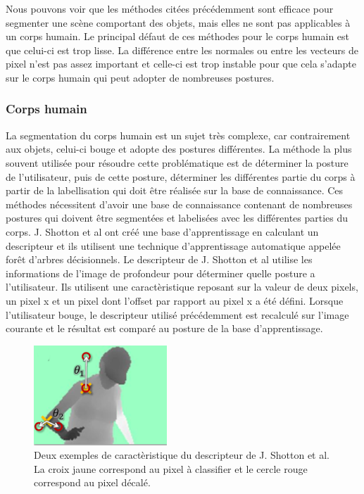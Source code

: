 Nous pouvons voir que les méthodes citées précédemment sont efficace pour segmenter une scène comportant des objets,
mais elles ne sont pas applicables à un corps humain. Le principal défaut de ces méthodes pour le corps humain est 
que celui-ci est trop lisse. La différence entre les normales ou entre les vecteurs de pixel n'est pas assez important
et celle-ci est trop instable pour que cela s'adapte sur le corps humain qui peut adopter de nombreuses postures.

\subsubsection{Corps humain}
La segmentation du corps humain est un sujet très complexe, car contrairement aux objets, celui-ci bouge et adopte
des postures différentes. La méthode la plus souvent utilisée pour résoudre cette problématique est de déterminer
la posture de l'utilisateur, puis de cette posture, déterminer les différentes partie du corps à partir de la labellisation
qui doit être réalisée sur la base de connaissance. 
Ces méthodes nécessitent d'avoir une base de connaissance contenant de nombreuses postures qui doivent
être segmentées et labelisées avec les différentes parties du corps. J. Shotton et al\cite{kinectSegmentation} ont
créé une base d'apprentissage en calculant un descripteur
et ils utilisent une technique d'apprentissage automatique appelée forêt d'arbres décisionnels\cite{randomDecisionForest}. 
Le descripteur de J. Shotton et al\cite{kinectSegmentation} utilise les informations de l'image de 
profondeur pour déterminer quelle posture a l'utilisateur. Ils utilisent une caractèristique reposant sur la valeur
de deux pixels, un pixel x et un pixel dont l'offset par rapport au pixel x a été défini.
Lorsque l'utilisateur bouge, le descripteur utilisé précédemment est recalculé sur l'image courante et le résultat 
est comparé au posture de la base d'apprentissage.\\

\begin{figure}[!ht]
  \begin{center}
    \includegraphics[width=5cm]{image/shotton.png}
    \caption{Deux exemples de caractèristique du descripteur de J. Shotton et al\cite{kinectSegmentation}. 
    La croix jaune correspond au pixel à classifier et le cercle rouge correspond au pixel décalé.}
  \end{center}
\end{figure}

